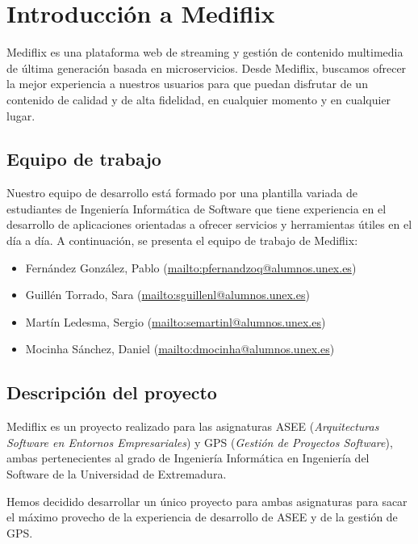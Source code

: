\documentclass[../main.tex]{subfiles}
\begin{document}
\section{Introducción a Mediflix}

Mediflix es una plataforma web de streaming y gestión de contenido multimedia de última generación basada en microservicios. Desde Mediflix, buscamos ofrecer la mejor experiencia a nuestros usuarios para que puedan disfrutar de un contenido de calidad y de alta fidelidad, en cualquier momento y en cualquier lugar.\par

\subsection{Equipo de trabajo}

Nuestro equipo de desarrollo está formado por una plantilla variada de estudiantes de Ingeniería Informática de Software que tiene experiencia en el desarrollo de aplicaciones orientadas a ofrecer servicios y herramientas útiles en el día a día. A continuación, se presenta el equipo de trabajo de Mediflix:\par

\begin{itemize}
    \item Fernández González, Pablo (\url{mailto:pfernandzoq@alumnos.unex.es})
    \item Guillén Torrado, Sara (\url{mailto:sguillenl@alumnos.unex.es})
    \item Martín Ledesma, Sergio (\url{mailto:semartinl@alumnos.unex.es})
    \item Mocinha Sánchez, Daniel (\url{mailto:dmocinha@alumnos.unex.es})
\end{itemize}

\subsection{Descripción del proyecto}

Mediflix es un proyecto realizado para las asignaturas ASEE (\textit{Arquitecturas Software en Entornos Empresariales}) y GPS (\textit{Gestión de Proyectos Software}), ambas pertenecientes al grado de Ingeniería Informática en Ingeniería del Software de la Universidad de Extremadura.\par

Hemos decidido desarrollar un único proyecto para ambas asignaturas para sacar el máximo provecho de la experiencia de desarrollo de ASEE y de la gestión de GPS. \par

\end{document}
